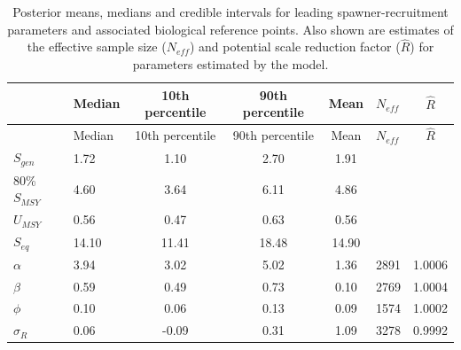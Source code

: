 \documentclass[11pt]{book}
\begin{document}
\begin{longtable}[]{@{}llccclc@{}}
\caption{\label{tab:tab-bench-parms}Posterior means, medians and credible intervals for leading spawner-recruitment parameters and associated biological reference points. Also shown are estimates of the effective sample size (\(N_{eff}\)) and potential scale reduction factor (\(\hat{R}\)) for parameters estimated by the model.}\tabularnewline
\toprule\noalign{}
& Median & 10th percentile & 90th percentile & Mean & \(N_{eff}\) & \(\hat{R}\) \\
\midrule\noalign{}
\endfirsthead
\toprule\noalign{}
& Median & 10th percentile & 90th percentile & Mean & \(N_{eff}\) & \(\hat{R}\) \\
\midrule\noalign{}
\endhead
\bottomrule\noalign{}
\endlastfoot
\(S_{gen}\) & 1.72 & 1.10 & 2.70 & 1.91 & & \\
80\% \(S_{MSY}\) & 4.60 & 3.64 & 6.11 & 4.86 & & \\
\(U_{MSY}\) & 0.56 & 0.47 & 0.63 & 0.56 & & \\
\(S_{eq}\) & 14.10 & 11.41 & 18.48 & 14.90 & & \\
\(\alpha\) & 3.94 & 3.02 & 5.02 & 1.36 & 2891 & 1.0006 \\
\(\beta\) & 0.59 & 0.49 & 0.73 & 0.10 & 2769 & 1.0004 \\
\(\phi\) & 0.10 & 0.06 & 0.13 & 0.09 & 1574 & 1.0002 \\
\(\sigma_{R}\) & 0.06 & -0.09 & 0.31 & 1.09 & 3278 & 0.9992 \\
\end{longtable}
\end{document}
